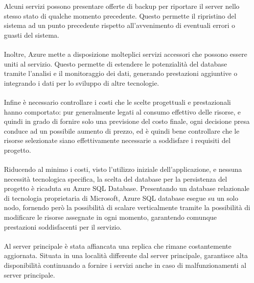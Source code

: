 Alcuni servizi possono presentare offerte di backup per riportare il server nello stesso stato di qualche momento precedente. 
Questo permette il ripristino del sistema ad un punto precedente rispetto all’avvenimento di eventuali errori o guasti del sistema.\\
\\

Inoltre, Azure mette a disposizione molteplici servizi accessori che possono essere uniti al servizio. 
Questo permette di estendere le potenzialità del database tramite  l’analisi e il monitoraggio dei dati, 
generando prestazioni aggiuntive o integrando i dati per lo sviluppo di altre tecnologie.\\
\\
Infine è necessario controllare i costi che le scelte progettuali e prestazionali hanno comportato: 
pur generalmente legati al consumo effettivo delle risorse, e quindi in grado di fornire solo una previsione del costo finale, 
ogni decisione presa conduce ad un possibile aumento di prezzo, 
ed è quindi bene controllare che le risorse selezionate siano effettivamente  necessarie a soddisfare i requisiti del progetto.\\
\\
Riducendo al minimo i costi, visto l’utilizzo iniziale dell’applicazione, e nessuna necessità tecnologica specifica, 
la scelta del database per la persistenza del progetto è ricaduta su Azure SQL Database. 
Presentando un database relazionale di tecnologia proprietaria di Microsoft, Azure SQL database esegue su un solo nodo, 
fornendo però la possibilità di  scalare  verticalmente tramite la possibilità di modificare le risorse assegnate in ogni momento, 
garantendo comunque prestazioni soddisfacenti per il servizio.\\
\\
Al server principale è stata affiancata una replica che rimane costantemente aggiornata. 
Situata in una località differente dal server principale, garantisce alta disponibilità continuando a fornire i servizi anche in caso di malfunzionamenti al server principale.
\clearpage

